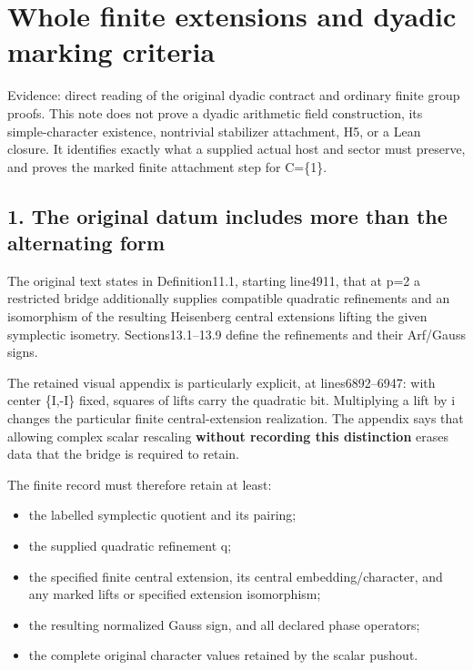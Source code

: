 \clearpage
\section{Whole finite extensions and dyadic marking criteria}\label{app:dyadic_markings}

Evidence: direct reading of the original dyadic contract and ordinary
finite group proofs. This note does not prove a dyadic arithmetic field
construction, its simple-character existence, nontrivial stabilizer
attachment, H5, or a Lean closure. It identifies exactly what a supplied
actual host and sector must preserve, and proves the marked finite
attachment step for C=\{1\}.

\hypertarget{dyadic_markings-the-original-datum-includes-more-than-the-alternating-form}{%
\subsection{1. The original datum includes more than the alternating
form}\label{dyadic_markings-the-original-datum-includes-more-than-the-alternating-form}}

The original text
 states in
Definition11.1, starting line4911, that at p=2 a restricted bridge
additionally supplies compatible quadratic refinements and an
isomorphism of the resulting Heisenberg central extensions lifting the
given symplectic isometry. Sections13.1--13.9 define the refinements and
their Arf/Gauss signs.

The retained visual appendix is particularly explicit, at
lines6892--6947: with center \{I,-I\} fixed, squares of lifts carry the
quadratic bit. Multiplying a lift by i changes the particular finite
central-extension realization. The appendix says that allowing complex
scalar rescaling \textbf{without recording this distinction} erases data
that the bridge is required to retain.

The finite record must therefore retain at least:

\begin{itemize}
\tightlist
\item
  the labelled symplectic quotient and its pairing;
\item
  the supplied quadratic refinement q;
\item
  the specified finite central extension, its central
  embedding/character, and any marked lifts or specified extension
  isomorphism;
\item
  the resulting normalized Gauss sign, and all declared phase operators;
\item
  the complete original character values retained by the scalar pushout.
\end{itemize}

